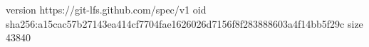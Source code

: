 version https://git-lfs.github.com/spec/v1
oid sha256:a15cac57b27143ea414cf7704fae1626026d7156f8f283888603a4f14bb5f29c
size 43840
